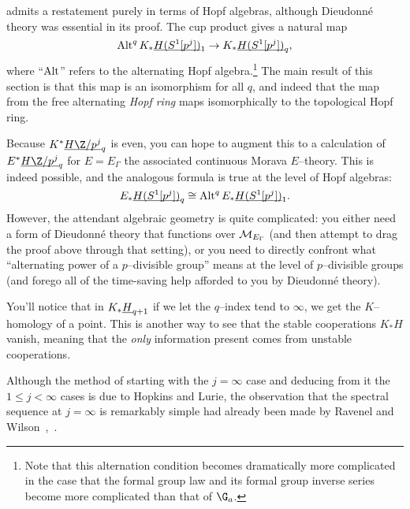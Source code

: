 \begin{remark}
 admits a restatement purely in terms of Hopf algebras, although Dieudonn\'e theory was essential in its proof.  The cup product gives a natural map \[\operatorname{Alt}^q K_* \underline{\smash{H(S^1[p^j])}}_{1} \to K_* \underline{\smash{H(S^1[p^j])}}_{q},\] where ``\(\operatorname{Alt}\)'' refers to the alternating Hopf algebra.\footnote{Note that this alternation condition becomes dramatically more complicated in the case that the formal group law and its formal group inverse series become more complicated than that of \(\G_a\).}  The main result of this section is that this map is an isomorphism for all \(q\), and indeed that the map from the free alternating \emph{Hopf ring} maps isomorphically to the topological Hopf ring.
\end{remark}

\begin{remark}\label{EThyOfEMSpaces}
Because \(K^* \OS{H\Z/p^j}{q}\) is even, you can hope to augment this to a calculation of \(E^* \OS{H\Z/p^j}{q}\) for \(E = E_\Gamma\) the associated continuous Morava \(E\)--theory.  This is indeed possible, and the analogous formula is true at the level of Hopf algebras: \[E_* \underline{\smash{H(S^1[p^j])}}_{q} \cong \operatorname{Alt}^q E_* \underline{\smash{H(S^1[p^j])}}_{1}.\] However, the attendant algebraic geometry is quite complicated: you either need a form of Dieudonn\'e theory that functions over \(\mathcal{M}_{E_\Gamma}\) (and then attempt to drag the proof above through that setting), or you need to directly confront what ``alternating power of a \(p\)--divisible group'' means at the level of \(p\)--divisible groups (and forego all of the time-saving help afforded to you by Dieudonn\'e theory).
\end{remark}

\begin{remark}
You'll notice that in \(K_* \underline{\smash{H}}_{q+1}\) if we let the \(q\)--index tend to \(\infty\), we get the \(K\)--homology of a point.  This is another way to see that the stable cooperations \(K_* H\) vanish, meaning that the \emph{only} information present comes from unstable cooperations.
\end{remark}

\begin{remark}
Although the method of starting with the \(j = \infty\) case and deducing from it the \(1 \le j < \infty\) cases is due to Hopkins and Lurie, the observation that the spectral sequence at \(j = \infty\) is remarkably simple had already been made by Ravenel and Wilson~\cite[Theorem 12.3]{RavenelWilsonKthyOfEMSpaces},~\cite[Theorem 8.1.3]{RWY}.
\end{remark}

